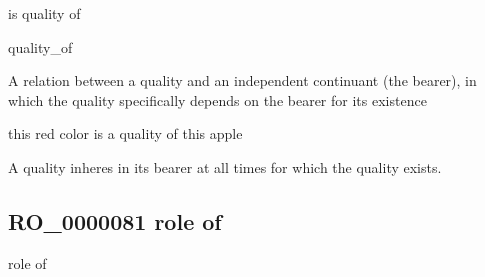 \documentclass[letterpaper,10pt,english]{sphinxmanual}
\begin{document}
\begin{sphinxShadowBox}

\sphinxAtStartPar
is quality of

\sphinxAtStartPar
quality\_of
\end{sphinxShadowBox}

\begin{sphinxShadowBox}

\sphinxAtStartPar
{\hyperref[\detokenize{doc-RO_0000052::doc}]{}}
\end{sphinxShadowBox}

\begin{sphinxShadowBox}

\sphinxAtStartPar
A relation between a quality and an independent continuant (the bearer), in which the quality specifically depends on the bearer for its existence
\end{sphinxShadowBox}

\begin{sphinxShadowBox}

\sphinxAtStartPar
this red color is a quality of this apple
\end{sphinxShadowBox}

\begin{sphinxShadowBox}

\sphinxAtStartPar
A quality inheres in its bearer at all times for which the quality exists.
\end{sphinxShadowBox}

\begin{sphinxShadowBox}

\sphinxAtStartPar
{}
\end{sphinxShadowBox}
\begin{quote}

\ignorespaces \end{quote}


\subsection{RO\_0000081 \sphinxhyphen{} role of}
\label{\detokenize{doc-RO_0000081:ro-0000081-role-of}}\label{\detokenize{doc-RO_0000081:index-0}}\label{\detokenize{doc-RO_0000081::doc}}
\begin{sphinxShadowBox}

\sphinxAtStartPar
role of
\end{sphinxShadowBox}
\end{document}
